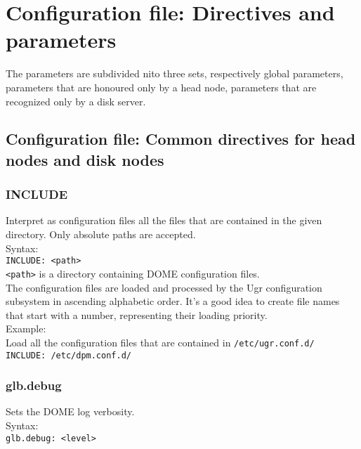 \documentclass[a4paper,10pt]{scrreprt}
\begin{document}
\section{Configuration file: Directives and parameters}
The parameters are subdivided nito three sets, respectively global parameters, parameters that are honoured only by a head node, parameters that are recognized only by a disk server.



\subsection{Configuration file: Common directives for head nodes and disk nodes}

\subsubsection{INCLUDE}
Interpret as configuration files all the files that are contained in the given directory.
Only absolute paths are accepted.\\

Syntax:\\

\lstinline"INCLUDE: <path>"\\

\lstinline"<path>" is a directory containing DOME configuration files.\\

The configuration files are loaded and processed by the Ugr configuration subsystem
in ascending alphabetic order. It's a good idea to create file names that start with a number,
representing their loading priority.\\

Example:\\
Load all the configuration files that are contained in \lstinline"/etc/ugr.conf.d/"\\
\lstinline"INCLUDE: /etc/dpm.conf.d/"

\subsubsection{glb.debug}

 Sets the DOME log verbosity.\\

 Syntax:\\

\lstinline"glb.debug: <level>"\\
\end{document}

